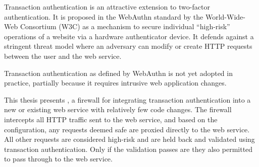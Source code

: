 % 
% 
%



Transaction authentication is an attractive extension to two-factor authentication. It is proposed in the WebAuthn standard by the World-Wide-Web Consortium (W3C) as a mechanism to secure individual ``high-risk'' operations of a website via a hardware authenticator device. It defends against a stringent threat model where an adversary can modify or create HTTP requests between the user and the web service. 

Transaction authentication as defined by WebAuthn is not yet adopted in practice, partially because it requires intrusive web application changes.




This thesis presents \sys{}, a firewall for integrating transaction authentication into a new or existing web service with relatively few code changes. The firewall intercepts all HTTP traffic sent to the web service, and based on the configuration, any requests deemed safe are proxied directly to the web service. All other requests are considered high-risk and are held back and validated using transaction authentication. Only if the validation passes are they also permitted to pass through to the web service.

